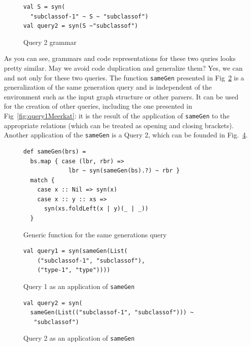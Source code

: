 \begin{figure}[h]
\begin{lstlisting}
val S = syn(
  "subclassof-1" ~ S ~ "subclassof")
val query2 = syn(S ~"subclassof")
\end{lstlisting}
\caption{Query 2 grammar}
\label{fig:query2Meerkat}
\end{figure}

As you can see, grammars and code representations for these two quries looks pretty similar.
May we avoid code duplication and generalize them? 
Yes, we can and not only for these two queries.
The function \lstinline{sameGen} presented in Fig~\ref{fig:gen} is a generalization of the same generation query and is independent of the environment such as the input graph structure or other parsers.
It can be used for the creation of other queries, including the one presented in Fig~\ref{fig:query1Meerkat}: it is the result of the application of \lstinline{sameGen} to the appropriate relations (which can be treated as opening and closing brackets).
Another application of the \lstinline{sameGen} is a Query 2, which can be founded in Fig.~\ref{fig:query2Gen}.


\begin{figure}[h]
\begin{lstlisting}
def sameGen(brs) =
  bs.map { case (lbr, rbr) => 
             lbr ~ syn(sameGen(bs).?) ~ rbr } 
  match {
    case x :: Nil => syn(x)
    case x :: y :: xs => 
      syn(xs.foldLeft(x | y)(_ | _))
  }
\end{lstlisting}
\caption{Generic function for the same generations query}
\label{fig:gen}
\end{figure}


\begin{figure}[h]
\begin{lstlisting}
val query1 = syn(sameGen(List(
    ("subclassof-1", "subclassof"),
    ("type-1", "type"))))
\end{lstlisting}
\caption{Query 1 as an application of \lstinline{sameGen}}
\label{fig:query1Gen}
\end{figure}


\begin{figure}[h]
\begin{lstlisting}
val query2 = syn(
  sameGen(List(("subclassof-1", "subclassof"))) ~
   "subclassof")
\end{lstlisting}
\caption{Query 2 as an application of \lstinline{sameGen}}
\label{fig:query2Gen}
\end{figure}


